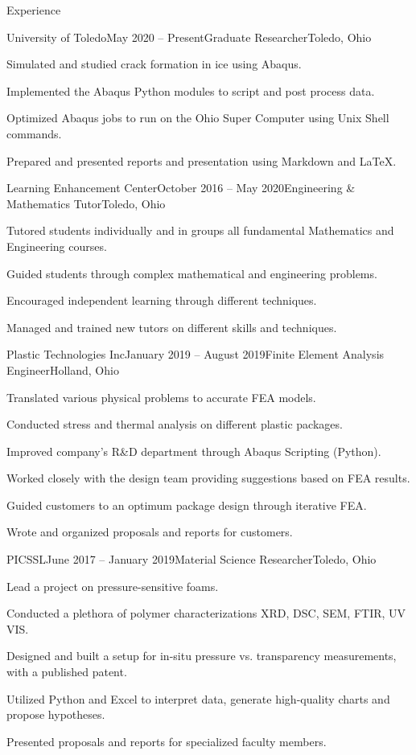 \documentclass{bilal}
\begin{document}
\begin{rSection}{Experience}
\begin{rSubsection}{University of Toledo}{May 2020 -- Present}{Graduate Researcher}{Toledo, Ohio}
\item Simulated and studied crack formation in ice using Abaqus.
\item Implemented the Abaqus Python modules to script and post process data.
\item Optimized Abaqus jobs to run on the Ohio Super Computer using Unix Shell commands.
\item Prepared and presented reports and presentation using Markdown and \LaTeX.
\end{rSubsection}
\begin{rSubsection}{Learning Enhancement Center}{October 2016 -- May 2020}{Engineering \& Mathematics Tutor}{Toledo, Ohio}
\item Tutored students individually and in groups all fundamental Mathematics and Engineering courses.
\item Guided students through complex mathematical and engineering problems.
\item Encouraged independent learning through different techniques.
\item Managed and trained new tutors on different skills and techniques.
\end{rSubsection}
\begin{rSubsection}{Plastic Technologies Inc}{January 2019 -- August 2019}{Finite Element Analysis Engineer}{Holland, Ohio}
\item Translated various physical problems to accurate FEA models.
\item Conducted stress and thermal analysis on different plastic packages.
\item Improved company's R\&D department through Abaqus Scripting (Python).
\item Worked closely with the design team providing suggestions based on FEA results.
\item Guided customers to an optimum package design through iterative FEA.
\item Wrote and organized proposals and reports for customers.
\end{rSubsection}
\begin{rSubsection}{PICSSL}{June 2017 -- January 2019}{Material Science Researcher}{Toledo, Ohio}
\item Lead a project on pressure-sensitive foams.
\item Conducted a plethora of polymer characterizations XRD, DSC, SEM, FTIR, UV VIS.
\item Designed and built a setup for in-situ pressure vs. transparency measurements, with a published patent.
\item Utilized Python and Excel to interpret data, generate high-quality charts and propose hypotheses.
\item Presented proposals and reports for specialized faculty members.
\end{rSubsection}
\end{rSection}
\end{document}
